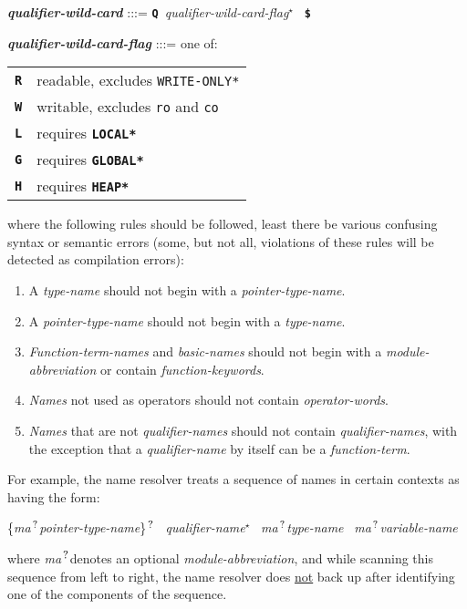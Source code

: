 \documentclass[12pt]{article}
\newcommand{\TT}[1]{{\tt \bfseries #1}}
\newcommand{\STAR}{{\Large $^\star$}}
\newcommand{\QMARK}{{$^{\,\mbox{\footnotesize ?}}$}}
\newcommand{\MA}{{\em ma}\QMARK}
\newcommand{\ttkey}[1]{{\tt \bfseries #1}}
\newcommand{\emkey}[1]{{\em \bfseries #1}}
\newenvironment{indpar}[1][0.3in]%
	{\begin{list}{}%
		     {\setlength{\itemsep}{0in}%
		      \setlength{\topsep}{0in}%
		      \setlength{\parsep}{1ex}%
		      \setlength{\labelwidth}{#1}%
		      \setlength{\leftmargin}{#1}%
		      \addtolength{\leftmargin}{\labelsep}}%
	 \item}%
	{\end{list}}
\begin{document}
\begin{indpar}
\emkey{qualifier-wild-card}\label{QUALIFIER-WILD-CARD} :::=
    \TT{Q}~{\em qualifier-wild-card-flag}\STAR{}~ \TT{\$}

\emkey{qualifier-wild-card-flag}\label{QUALIFIER-WILD-FLAG} :::= one of: \\
\hspace*{0.2in}\begin{tabular}{rp{4in}}
\ttkey{R} & readable, excludes {\tt *WRITE-ONLY*} \\
\ttkey{W} & writable, excludes {\tt ro} and {\tt co} \\
\ttkey{L} & requires \TT{*LOCAL*} \\
\ttkey{G} & requires \TT{*GLOBAL*} \\
\ttkey{H} & requires \TT{*HEAP*} \\
\end{tabular}


where the following rules should be followed, least there be
various confusing syntax or semantic errors (some, but not all,
violations of these rules will be detected as compilation errors):
\begin{enumerate}
\item
A {\em type-name} should not begin with a {\em pointer-type-name}.
\item
A {\em pointer-type-name} should not begin with a {\em type-name}.
\item
{\em Function-term-names} and {\em basic-names}
should not begin with a {\em module-abbre\-viation}
or contain {\em function-keywords}.
\item
{\em Names} not used as operators should not contain {\em operator-words}.
\item
{\em Names} that are not {\em qualifier-names}
should not contain {\em qualifier-names}, with the
exception that a {\em qualifier-name} by itself can be
a {\em function-term}.
\end{enumerate}
\end{indpar}

For example,
the name resolver treats a sequence of
names in certain contexts as having the form:
\begin{center}
\{\MA {\em pointer-type-name}\}\QMARK{}~
{\em qualifier-name}\STAR{}~
\MA {\em type-name}~
\MA {\em variable-name}
\end{center}
where \MA denotes an optional {\em module-abbreviation},
and while scanning this sequence from left to right,
the name resolver does \underline{not} back up after identifying
one of the components of the sequence.
\end{document}
